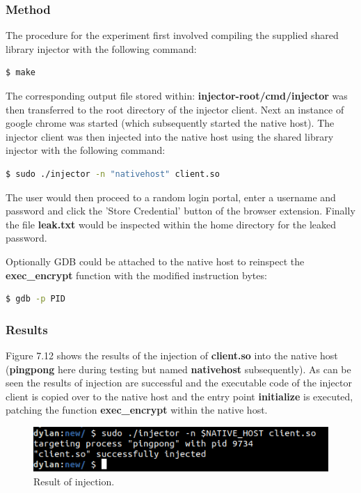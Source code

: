 \subsubsection{Method}

The procedure for the experiment first involved compiling the supplied shared library injector \cite{injector} with the following command:
\begin{lstlisting}[language=bash, frame=none]
$ make
\end{lstlisting}

The corresponding output file stored within: \textbf{injector-root/cmd/injector} was then transferred to the root directory of the injector client. Next an instance of google chrome was started (which subsequently started the native host). The injector client was then injected into the native host using the shared library injector with the following command:

\begin{lstlisting}[language=bash, frame=none]
$ sudo ./injector -n "nativehost" client.so
\end{lstlisting}

The user would then proceed to a random login portal, enter a username and password and click the 'Store Credential' button of the browser extension. Finally the file \textbf{leak.txt} would be inspected within the home directory for the leaked password.

Optionally GDB could be attached to the native host to reinspect the \textbf{exec\_encrypt} function with the modified instruction bytes:

\begin{lstlisting}[language=bash, frame=none]
$ gdb -p PID
\end{lstlisting}

\subsubsection{Results}

Figure 7.12 shows the results of the injection of \textbf{client.so} into the native host (\textbf{pingpong} here during testing but named \textbf{nativehost} subsequently). As can be seen the results of injection are successful and the executable code of the injector client is copied over to the native host and the entry point \textbf{initialize} is executed, patching the function \textbf{exec\_encrypt} within the native host.
\begin{figure}[H]
\centering
\includegraphics[width=0.8\columnwidth]{Figures/Fig_39.png}
\caption{Result of injection.}
\label{fig:gantt}
\end{figure}

